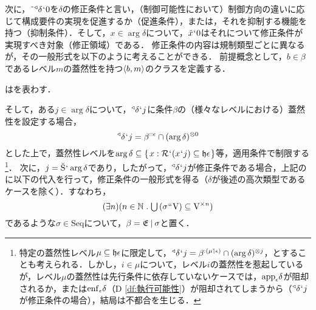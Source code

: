 次に，$ \tilde{\:\:}{^\triangleleft}\delta{\mspace{1mu}{`}\mspace{1mu}} 0 $を$\delta$の修正条件と言い，（制御可能性において）制御方向の違いに応じて構成要件の実現を促進するか（促進条件），または，それを抑制する機能を持つ（抑制条件）．そして，$ x\in\arg \delta $について，$\tilde{x}{\mspace{1mu}{`}\mspace{1mu}} 0$はそれについて修正条件が実現すべき対象（修正領域）である．
修正条件の内容は規制類型ごとに異なるが，その一般形式を以下のように考えることができる．
前提概念として，$b\in\beta$であるレベル$m$の蓋然性を持つ$\langle b,m \rangle$のクラスを定義する．
\begin{df}
\label{df:危険測度関係}
\kagi{$
    \beta^{::\epsilon}
$}はを表わす．
\end{df}
\noindent そして，ある$j\in\arg\delta$について，${^\triangleleft}\delta{\mspace{1mu}{`}\mspace{1mu}} j$に条件$\beta$の（様々なレベルにおける）蓋然性を設定する場合，
\[
    {^\triangleleft}\delta{\mspace{1mu}{`}\mspace{1mu}} j = \beta^{::\epsilon}\cap(\arg\delta)^{\otimes 0}
\]
とした上で，蓋然性レベルを$ \arg\delta\subseteq\{\mspace{2mu}x:\mathcal{R}{\mspace{1mu}{`}\mspace{1mu}}(x{\mspace{1mu}{`}\mspace{1mu}} j)\subseteq\mathfrak{h}\epsilon\mspace{2mu}\} $等，適用条件で制限する\footnote{
    特定の蓋然性レベル$\mu\subseteq\mathfrak{h}\epsilon$に限定して，$ {^\triangleleft}\delta{\mspace{1mu}{`}\mspace{1mu}} j = \beta^{:(\mu\mathbin{\upharpoonleft}\epsilon)}\cap(\arg\delta)^{\otimes j}$，とすることも考えられる．しかし，$i\in \mu$について，レベル$i$の蓋然性を惹起しているが，レベル$\mu$の蓋然性は先行条件に依存していないケースでは，$\mathrm{app}_{\epsilon}\delta$が阻却されるか，または$\mathrm{enf}_{\epsilon}\delta$（D \ref{df:執行可能性}）が阻却されてしまうから（${^\triangleleft}\delta{\mspace{1mu}{`}\mspace{1mu}} j$が修正条件の場合），結局は不都合を生じる．
}．
次に，$j = \breve{\mathrm{S}}{\mspace{1mu}{`}\mspace{1mu}}\arg\delta$であり，したがって，$ {^\triangleleft}\delta{\mspace{1mu}{`}\mspace{1mu}} j $が修正条件である場合，上記の\kagi{$ \beta $}に以下の代入を行って，修正条件の一般形式を得る（$\delta$が後述の高次類型であるケースを除く）．すなわち，
\[
    (\exists n)(n\in\mathbb{N}\con{1}\union{(\sigma\img\univ)}\subseteq\timex{\univ}{n})
\]
であるような$ \sigma\in\mathrm{Seq} $について，$\beta = \mathfrak{E}\mathbin{\mid}\sigma$と置く．

